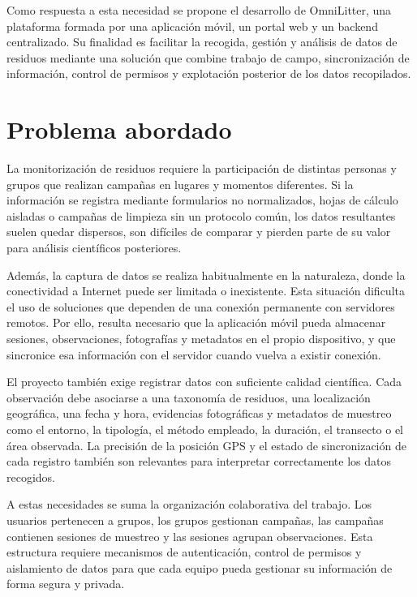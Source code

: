 Como respuesta a esta necesidad se propone el desarrollo de OmniLitter, una
plataforma formada por una aplicación móvil, un portal web y un backend
centralizado. Su finalidad es facilitar la recogida, gestión y análisis de datos
de residuos mediante una solución que combine trabajo de campo, sincronización de
información, control de permisos y explotación posterior de los datos
recopilados.

\section{Problema abordado}

La monitorización de residuos requiere la participación de distintas personas y
grupos que realizan campañas en lugares y momentos diferentes. Si la información
se registra mediante formularios no normalizados, hojas de cálculo aisladas o
campañas de limpieza sin un protocolo común, los datos resultantes suelen quedar
dispersos, son difíciles de comparar y pierden parte de su valor para análisis
científicos posteriores.

Además, la captura de datos se realiza habitualmente en la naturaleza, donde la
conectividad a Internet puede ser limitada o inexistente. Esta situación dificulta
el uso de soluciones que dependen de una conexión permanente con servidores
remotos. Por ello, resulta necesario que la aplicación móvil pueda almacenar
sesiones, observaciones, fotografías y metadatos en el propio dispositivo, y que
sincronice esa información con el servidor cuando vuelva a existir conexión.

El proyecto también exige registrar datos con suficiente calidad científica. Cada
observación debe asociarse a una taxonomía de residuos, una localización
geográfica, una fecha y hora, evidencias fotográficas y metadatos de muestreo
como el entorno, la tipología, el método empleado, la duración, el transecto o el
área observada. La precisión de la posición GPS y el estado de sincronización de
cada registro también son relevantes para interpretar correctamente los datos
recogidos.

A estas necesidades se suma la organización colaborativa del trabajo. Los
usuarios pertenecen a grupos, los grupos gestionan campañas, las campañas
contienen sesiones de muestreo y las sesiones agrupan observaciones. Esta
estructura requiere mecanismos de autenticación, control de permisos y aislamiento
de datos para que cada equipo pueda gestionar su información de forma segura y
privada.


